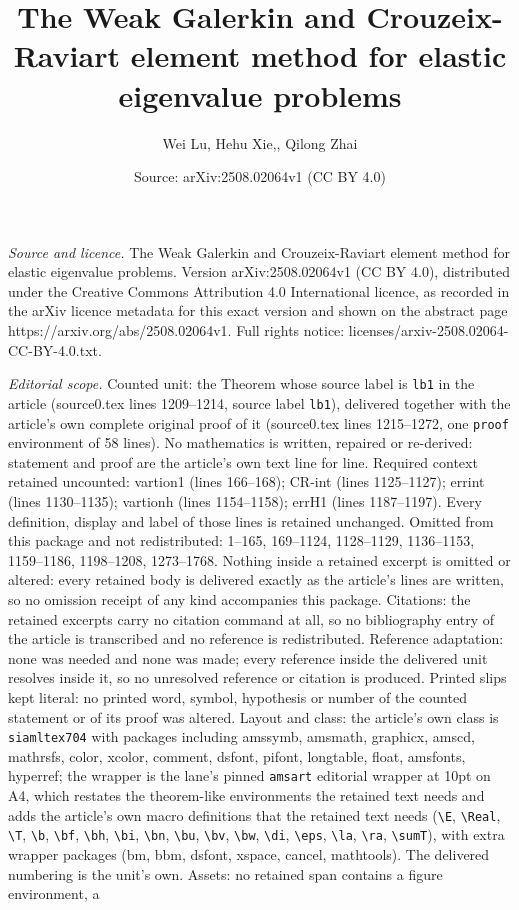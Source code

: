 \documentclass[10pt,a4paper]{amsart}
\title[The Weak Galerkin and Crouzeix-Raviart element method for el]{The Weak Galerkin and Crouzeix-Raviart element method for elastic eigenvalue problems}
\author{Wei Lu, Hehu Xie,, Qilong Zhai}
\date{Source: arXiv:2508.02064v1 (CC BY 4.0)}
\begin{document}
\maketitle

\noindent\emph{Source and licence.} The Weak Galerkin and Crouzeix-Raviart element method for elastic eigenvalue problems. Version arXiv:2508.02064v1 (CC BY 4.0), distributed under the Creative Commons Attribution 4.0 International licence, as recorded in the arXiv licence metadata for this exact version and shown on the abstract page https://arxiv.org/abs/2508.02064v1. Full rights notice: licenses/arxiv-2508.02064-CC-BY-4.0.txt.\par\smallskip

\noindent\textit{Editorial scope.} Counted unit: the Theorem whose source label is \texttt{lb1} in the article (source0.tex lines 1209--1214, source label \texttt{lb1}), delivered together with the article's own complete original proof of it (source0.tex lines 1215--1272, one \texttt{proof} environment of 58 lines). No mathematics is written, repaired or re-derived: statement and proof are the article's own text line for line. Required context retained uncounted: vartion1 (lines 166--168); CR-int (lines 1125--1127); errint (lines 1130--1135); vartionh (lines 1154--1158); errH1 (lines 1187--1197). Every definition, display and label of those lines is retained unchanged. Omitted from this package and not redistributed: 1--165, 169--1124, 1128--1129, 1136--1153, 1159--1186, 1198--1208, 1273--1768. Nothing inside a retained excerpt is omitted or altered: every retained body is delivered exactly as the article's lines are written, so no omission receipt of any kind accompanies this package. Citations: the retained excerpts carry no citation command at all, so no bibliography entry of the article is transcribed and no reference is redistributed. Reference adaptation: none was needed and none was made; every reference inside the delivered unit resolves inside it, so no unresolved reference or citation is produced. Printed slips kept literal: no printed word, symbol, hypothesis or number of the counted statement or of its proof was altered. Layout and class: the article's own class is \texttt{siamltex704} with packages including amssymb, amsmath, graphicx, amscd, mathrsfs, color, xcolor, comment, dsfont, pifont, longtable, float, amsfonts, hyperref; the wrapper is the lane's pinned \texttt{amsart} editorial wrapper at 10pt on A4, which restates the theorem-like environments the retained text needs and adds the article's own macro definitions that the retained text needs (\texttt{\textbackslash E}, \texttt{\textbackslash Real}, \texttt{\textbackslash T}, \texttt{\textbackslash b}, \texttt{\textbackslash bf}, \texttt{\textbackslash bh}, \texttt{\textbackslash bi}, \texttt{\textbackslash bn}, \texttt{\textbackslash bu}, \texttt{\textbackslash bv}, \texttt{\textbackslash bw}, \texttt{\textbackslash di}, \texttt{\textbackslash eps}, \texttt{\textbackslash la}, \texttt{\textbackslash ra}, \texttt{\textbackslash sumT}), with extra wrapper packages (bm, bbm, dsfont, xspace, cancel, mathtools). The delivered numbering is the unit's own. Assets: no retained span contains a figure environment, a 
\end{document}
